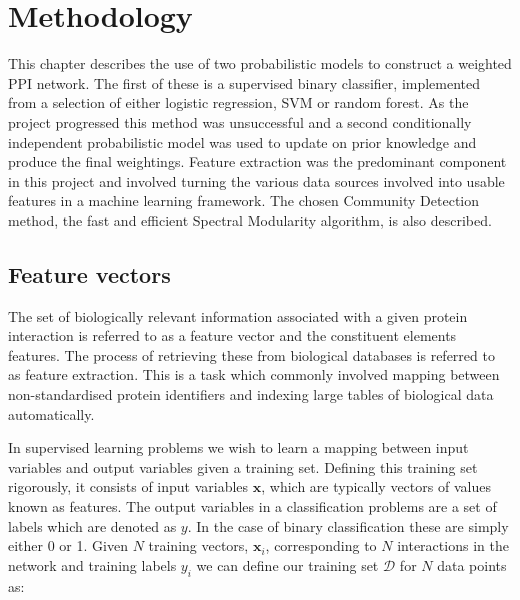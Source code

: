 \chapter{Methodology}
\label{methods}

This chapter describes the use of two probabilistic models to construct a weighted PPI network.
The first of these is a supervised binary classifier, implemented from a selection of either logistic regression, \ac{SVM} or random forest.
As the project progressed this method was unsuccessful and a second conditionally independent probabilistic model was used to update on prior knowledge and produce the final weightings.
Feature extraction was the predominant component in this project and involved turning the various data sources involved into usable features in a machine learning framework. 
The chosen Community Detection method, the fast and efficient Spectral Modularity algorithm, is also described. 

\section{Feature vectors}

The set of biologically relevant information associated with a given protein interaction is referred to as a feature vector and the constituent elements features.
The process of retrieving these from biological databases is referred to as feature extraction. 
This is a task which commonly involved mapping between non-standardised protein identifiers and indexing large tables of biological data automatically.

In supervised learning problems we wish to learn a mapping between input variables and output variables given a training set.
Defining this training set rigorously, it consists of input variables $\pmb{x}$, which are typically vectors of values known as features.
The output variables in a classification problems are a set of labels\autocite[2]{murphy_machine_2012} which are denoted as $y$.
In the case of binary classification these are simply either 0 or 1.
Given $N$ training vectors, $\pmb{x}_{i}$, corresponding to $N$ interactions in the network and training labels $y_{i}$ we can define our training set $\mathcal{D}$ for $N$ data points as:

